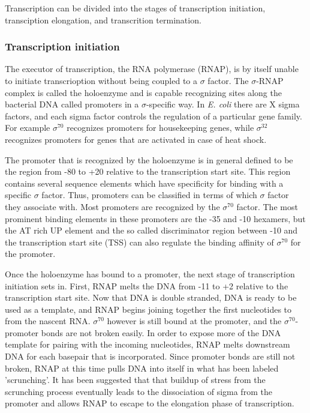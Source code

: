 %
%
Transcription can be divided into the stages of transcription initiation,
transciption elongation, and transcrition termination.

\subsubsection{Transcription initiation}
The executor of transcription, the RNA polymerase (RNAP), is by itself unable
to initiate transcrioption without being coupled to a $\sigma$ factor. The
$\sigma$-RNAP complex is called the holoenzyme and is capable recognizing sites
along the bacterial DNA called promoters in a $\sigma$-specific way. In
\textit{E. coli} there are X sigma factors, and each sigma factor controls the
regulation of a particular gene family. For example $\sigma^{70}$ recognizes
promoters for housekeeping genes, while $\sigma^{32}$ recognizes promoters for
genes that are activated in case of heat shock.

The promoter that is recognized by the holoenzyme is in general defined to be
the region from -80 to +20 relative to the transcription start site. This
region contains several sequence elements which have specificity for binding
with a specific $\sigma$ factor. Thus, promoters can be classified in terms of
which $\sigma$ factor they associate with. Most promoters are recognized by the
$\sigma^{70}$ factor. The most prominent binding elements in these promoters
are the -35 and -10 hexamers, but the AT rich UP element and the so called
discriminator region between -10 and the transcription start site (TSS) can
also regulate the binding affinity of $\sigma^{70}$ for the promoter.

Once the holoenzyme has bound to a promoter, the next stage of transcription
initiation sets in. First, RNAP melts the DNA from -11 to +2 relative to the
transcription start site. Now that DNA is double stranded, DNA is ready to be
used as a template, and RNAP begins joining together the first nucleotides to
from the nascent RNA. $\sigma^{70}$ however is still bound at the promoter, and
the $\sigma^{70}$-promoter bonds are not broken easily. In order to expose more
of the DNA template for pairing with the incoming nucleotides, RNAP melts
downstream DNA for each basepair that is incorporated. Since promoter bonds are
still not broken, RNAP at this time pulls DNA into itself in what has been
labeled 'scrunching'. It has been suggested that that buildup of stress from
the scrunching process eventually leads to the dissociation of sigma from the
promoter and allows RNAP to escape to the elongation phase of transcription.

